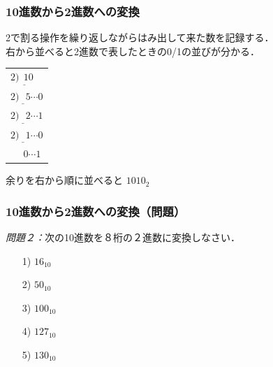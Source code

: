\documentclass[handout]{beamer}        %
\begin{document}
\begin{frame}
  \frametitle{10進数から2進数への変換}
2で割る操作を繰り返しながらはみ出して来た数を記録する．\\
右から並べると2進数で表したときの0/1の並びが分かる．

\begin{center}
\begin{minipage}{0.5\columnwidth}
\begin{flushright}
\begin{tabular}{l}
$2 \underline{) ~~10 } $\\
$2 \underline{) ~~~5  } {\cdots 0}$ \\
$2 \underline{) ~~~2  } {\cdots 1}$ \\
$2 \underline{) ~~~1  } {\cdots 0}$ \\
$~~            ~~~~0    {\cdots 1}$
\end{tabular}
\end{flushright}
\end{minipage}
\begin{minipage}{0.4\columnwidth}
余りを右から順に並べると $1010_2$
\end{minipage}
\end{center}
\end{frame}

\begin{frame}
  \frametitle{10進数から2進数への変換（問題）}

\emph{問題２：}次の10進数を８桁の２進数に変換しなさい．
\begin{enumerate}
\item[1)] $16_{10}$
\vfill
\item[2)] $50_{10}$
\vfill
\item[3)] $100_{10}$
\vfill
\item[4)] $127_{10}$
\vfill
\item[5)] $130_{10}$
\vfill
\end{enumerate}
\end{frame}
\end{document}
